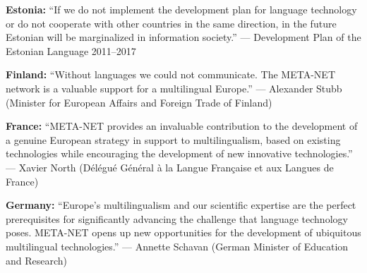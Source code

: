 \documentclass[10pt, plain]{../../metanetpaper}
\begin{document}

\medskip \textbf{Estonia:} ``If we do not implement the development plan for language technology or do not cooperate with other countries in the same direction, in the future Estonian will be marginalized in information society.'' --- Development Plan of the Estonian Language 2011--2017

\medskip \textbf{Finland:} ``Without languages we could not communicate. The META-NET network is a valuable support for a multilingual Europe.'' --- Alexander Stubb (Minister for European Affairs and Foreign Trade of Finland)


\medskip \textbf{France:} ``META-NET provides an invaluable contribution to the development of a genuine European strategy in support to multilingualism, based on existing technologies while encouraging the development of new innovative technologies.'' --- Xavier North (Délégué Général à la Langue Française et aux Langues de France)



\medskip \textbf{Germany:} ``Europe's multilingualism and our scientific expertise are the perfect prerequisites for significantly advancing the challenge that language technology poses. META-NET opens up new opportunities for the development of ubiquitous multilingual technologies.'' --- Annette Schavan (German Minister of Education and Research)
\end{document}
